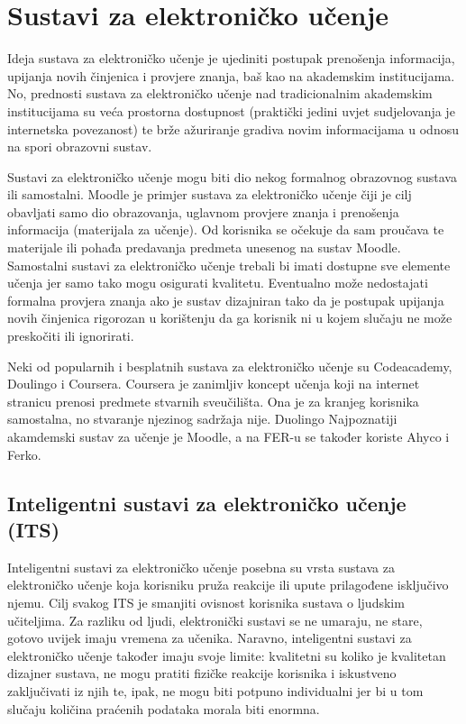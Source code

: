 \documentclass[times, utf8, zavrsni]{fer}
\begin{document}
\chapter{Sustavi za elektroničko učenje}
Ideja sustava za elektroničko učenje je ujediniti postupak prenošenja informacija, upijanja novih činjenica i provjere znanja, baš kao na akademskim institucijama. No, prednosti sustava za elektroničko učenje nad tradicionalnim akademskim institucijama su veća prostorna dostupnost (praktički jedini uvjet sudjelovanja je internetska povezanost) te brže ažuriranje gradiva novim informacijama u odnosu na spori obrazovni sustav.
\par
Sustavi za elektroničko učenje mogu biti dio nekog formalnog obrazovnog sustava ili samostalni. Moodle je primjer sustava za elektroničko učenje čiji je cilj obavljati samo dio obrazovanja, uglavnom provjere znanja i prenošenja informacija (materijala za učenje). Od korisnika se očekuje da sam proučava te materijale ili pohađa predavanja predmeta unesenog na sustav Moodle. Samostalni sustavi za elektroničko učenje trebali bi imati dostupne sve elemente učenja jer samo tako mogu osigurati kvalitetu. Eventualno može nedostajati formalna provjera znanja ako je sustav dizajniran tako da je postupak upijanja novih činjenica rigorozan u korištenju da ga korisnik ni u kojem slučaju ne može preskočiti ili ignorirati. 
\par
Neki od popularnih i besplatnih sustava za elektroničko učenje su Codeacademy, Doulingo i Coursera. Coursera je zanimljiv koncept učenja koji na internet stranicu prenosi predmete stvarnih sveučilišta. Ona je za kranjeg korisnika samostalna, no stvaranje njezinog sadržaja nije. Duolingo Najpoznatiji akamdemski sustav za učenje je Moodle, a na FER-u se također koriste Ahyco i Ferko.
\pagebreak
\section{Inteligentni sustavi za elektroničko učenje (ITS)}
Inteligentni sustavi za elektroničko učenje posebna su vrsta sustava za elektroničko učenje koja korisniku pruža reakcije ili upute prilagođene isključivo njemu. Cilj svakog ITS je smanjiti ovisnost korisnika sustava o ljudskim učiteljima. Za razliku od ljudi, elektronički sustavi se ne umaraju, ne stare, gotovo uvijek imaju vremena za učenika. Naravno, inteligentni sustavi za elektroničko učenje također imaju svoje limite: kvalitetni su koliko je kvalitetan dizajner sustava, ne mogu pratiti fizičke reakcije korisnika i iskustveno zaključivati iz njih te, ipak, ne mogu biti potpuno individualni jer bi u tom slučaju količina praćenih podataka morala biti enormna. 
\end{document}
